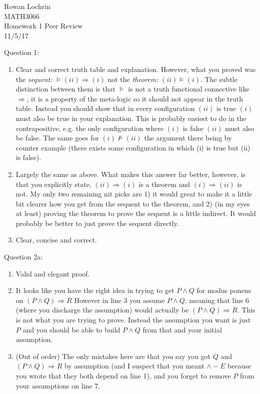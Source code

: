 \documentclass[11pt] {article}
\begin{document}
\begin{flushleft}
Rowan Lochrin\\
MATH3066\\
Homework 1 Peer Review\\
11/5/17\
\end{flushleft}
\noindent Question 1:
\begin{enumerate}
\item
Clear and correct truth table and explanation. However, what you proved was the \textit{sequent:} $\vDash (ii) \Rightarrow (i)$ not the \textit{theorem:} $(ii) \vDash (i)$. The subtle distinction between them is that $\vDash$ is not a truth functional connective like $\Rightarrow$, it is a property of the meta-logic so it should not appear in the truth table. Instead you should show that in every configuration $(ii)$ is true $(i)$ must also be true in your explanation. This is probably easiest to do in the contrapositive, e.g. the only configuration where $(i)$ is false $(ii)$ must also be false. The same goes for $(i) \nvDash (ii)$ the argument there being by counter example (there exists some configuration in which (i) is true but (ii) is false).
\item
Largely the same as above. What makes this answer far better, however, is that you explicitly state, $(ii) \Rightarrow (i)$ is a theorem and $(i)\Rightarrow (ii)$ is not. My only two remaining nit picks are 1) it would great to make it a little bit clearer how you get from the sequent to the theorem, and 2) (in my eyes at least) proving the theorem to prove the sequent is a little indirect. It would probably be better to just prove the sequent directly.
\item
Clear, concise and correct.
\end{enumerate}
Question 2a:
\begin{enumerate}
\item
Valid and elegant proof.
\item
It looks like you have the right idea in trying to get $P \land Q$ for modus ponens on $ (P\land Q) \Rightarrow R$ However in line 3 you assume $P \land Q$. meaning that line 6 (where you discharge the assumption) would actually be $(P \land Q) \Rightarrow R $. This is not what you are trying to prove. Instead the assumption you want is just $P$ and you should be able to build $P \land Q$ from that and your initial assumption.
\item (Out of order) The only mistakes here are that you say you got $Q$ and $(P\land Q) \Rightarrow R$ by assumption (and I suspect that you meant $\land-E$ because you wrote that they both depend on line 1), and you forget to remove $P$ from your assumptions on line 7.
\end{enumerate}
\end{document}
